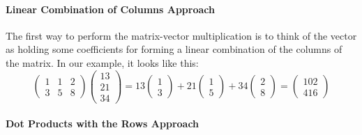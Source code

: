 \documentclass[10pt,]{book}
\theoremstyle{plain}
\theoremstyle{definition}
\numberwithin{equation}{section}
\begin{document}
\paragraph[Linear Combination of Columns Approach]{Linear Combination of Columns Approach}\label{paragraph-6}

          The first way to perform the matrix-vector multiplication is to think
          of the vector as holding some coefficients for forming a linear
          combination of the columns of the matrix. In our example, it looks
          like this:\[
            \begin{pmatrix} 1 & 1 & 2 \\ 3 & 5 & 8 \end{pmatrix}
            \begin{pmatrix} 13 \\ 21 \\ 34 \end{pmatrix} =
            13 \begin{pmatrix} 1 \\ 3 \end{pmatrix} + 21 \begin{pmatrix} 1 \\ 5
            \end{pmatrix} + 34 \begin{pmatrix} 2 \\ 8 \end{pmatrix} =
            \begin{pmatrix} 102 \\ 416 \end{pmatrix}
          \]
\typeout{************************************************}
\typeout{************************************************}
\paragraph[Dot Products with the Rows Approach]{Dot Products with the Rows Approach}\label{paragraph-7}
\end{document}
